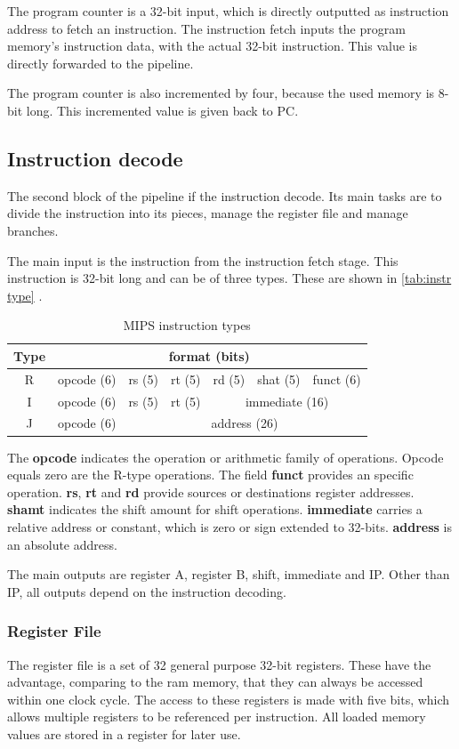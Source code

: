 The program counter is a 32-bit input, which is directly outputted as instruction address to fetch an instruction. The instruction fetch inputs the program memory's instruction data, 
with the actual 32-bit instruction. This value is directly forwarded to the pipeline.

The program counter is also incremented by four, because the used memory is 8-bit long. This incremented value is given back to PC.
\subsection{Instruction decode}
The second block of the pipeline if the instruction decode. Its main tasks are to divide the instruction into its pieces, manage the register file and manage branches.

The main input is the instruction from the instruction fetch stage. This instruction is 32-bit long and can be of three types. These are shown in \autoref{tab:instr type} \cite{mips32}.

\begin{table}[h!]
	\centering
	 \caption{MIPS instruction types}	
	\begin{tabular}{ccccccc}
		\toprule[2pt]
		\textbf{Type} & \multicolumn{6}{c}{\textbf{format (bits) }}   \\
		\toprule[2pt]
		R & opcode (6) & rs (5) & rt (5)   & rd (5) & shat (5) & funct (6) \\
		I & opcode (6) & rs (5) & rt (5)   & \multicolumn{3}{c}{ immediate (16)} \\
		J & opcode (6) & \multicolumn{5}{c}{ address (26)} \\	
		\bottomrule[2pt]
	\end{tabular} 
	\label{tab:instr type}
\end{table}

The \textbf{opcode} indicates the operation or arithmetic family of operations. Opcode equals zero are the R-type operations. The field \textbf{funct} provides an specific operation.
\textbf{rs}, \textbf{rt} and \textbf{rd} provide sources or destinations register addresses. \textbf{shamt} indicates the shift amount for shift operations. \textbf{immediate} carries
a relative address or constant, which is zero or sign extended to 32-bits. \textbf{address} is an absolute address.

The main outputs are register A, register B, shift, immediate and IP. Other than IP, all outputs depend on the instruction decoding.

\subsubsection{Register File}
The register file is a set of 32 general purpose 32-bit registers. These have the advantage, comparing to the ram memory, that they can always be accessed within one clock cycle.
The access to these registers is made with five bits, which allows multiple registers to be referenced per instruction. All loaded memory values are stored in a register
for later use.


